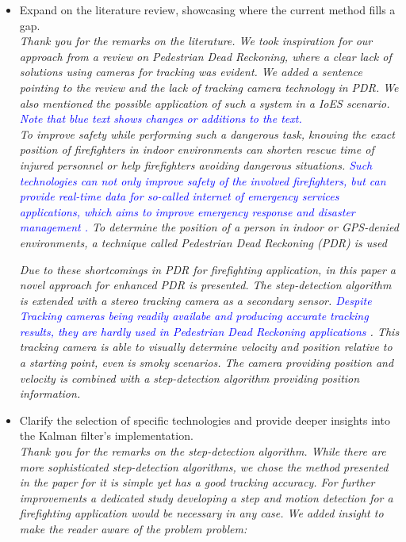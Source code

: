 \documentclass{article}
\begin{document}
\begin{itemize}
\item Expand on the literature review, showcasing where the current method fills a gap.\\
\textit{Thank you for the remarks on the literature. We took inspiration for our approach from a review on Pedestrian Dead Reckoning, where a clear lack of solutions using cameras for tracking was evident. We added a sentence pointing to the review and the lack of tracking camera technology in PDR. We also mentioned the possible application of such a system in a IoES scenario. \textcolor{blue}{Note that blue text shows changes or additions to the text.}}\\

\textit{To improve safety while performing such a dangerous task, knowing the exact position of firefighters in indoor environments can shorten rescue time of injured personnel or help firefighters avoiding dangerous situations. \textcolor{blue}{Such technologies can not only improve safety of the involved firefighters, but can provide  real-time data for so-called internet of emergency services applications, which aims to improve emergency response and disaster management \cite{damasevcius2023}.} To determine the position of a person in indoor or GPS-denied environments, a technique called Pedestrian Dead Reckoning (PDR) is used}




\textit{Due to these shortcomings in PDR for firefighting application, in this paper  a novel approach for enhanced PDR is presented. The step-detection algorithm is extended with a stereo tracking camera as a secondary sensor. \textcolor{blue}{Despite Tracking cameras being readily availabe and producing accurate tracking results, they are hardly used in Pedestrian Dead Reckoning applications \cite{hou2021}}. This tracking camera is able to visually determine velocity and position relative to a starting point, even is smoky scenarios. The camera providing position and velocity is combined with a step-detection algorithm providing position information.}

\item Clarify the selection of specific technologies and provide deeper insights into the Kalman filter's implementation.\\
\textit{Thank you for the remarks on the step-detection algorithm. While there are more sophisticated step-detection algorithms, we chose the method presented in the paper for it is simple yet has a good tracking accuracy. For further improvements a dedicated study developing a step and motion detection for a firefighting application would be necessary in any case. We added insight to make the reader aware of the problem problem:}


\end{itemize}
\end{document}
